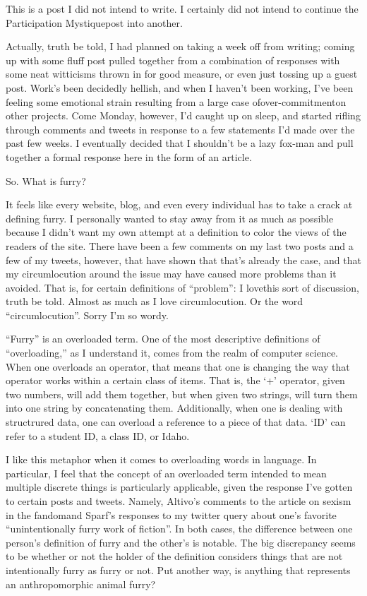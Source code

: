 
This is a post I did not intend to write. I certainly did not intend to continue the Participation Mystiquepost into another.

Actually, truth be told, I had planned on taking a week off from writing; coming up with some fluff post pulled together from a combination of responses with some neat witticisms thrown in for good measure, or even just tossing up a guest post. Work's been decidedly hellish, and when I haven't been working, I've been feeling some emotional strain resulting from a large case ofover-commitmenton other projects. Come Monday, however, I'd caught up on sleep, and started rifling through comments and tweets in response to a few statements I'd made over the past few weeks. I eventually decided that I shouldn't be a lazy fox-man and pull together a formal response here in the form of an article.

So. What is furry?

It feels like every website, blog, and even every individual has to take a crack at defining furry. I personally wanted to stay away from it as much as possible because I didn't want my own attempt at a definition to color the views of the readers of the site. There have been a few comments on my last two posts and a few of my tweets, however, that have shown that that's already the case, and that my circumlocution around the issue may have caused more problems than it avoided. That is, for certain definitions of ``problem'': I lovethis sort of discussion, truth be told. Almost as much as I love circumlocution. Or the word ``circumlocution''. Sorry I'm so wordy.

``Furry'' is an overloaded term. One of the most descriptive definitions of ``overloading,'' as I understand it, comes from the realm of computer science. When one overloads an operator, that means that one is changing the way that operator works within a certain class of items. That is, the `+' operator, given two numbers, will add them together, but when given two strings, will turn them into one string by concatenating them. Additionally, when one is dealing with structrured data, one can overload a reference to a piece of that data. `ID' can refer to a student ID, a class ID, or Idaho.

I like this metaphor when it comes to overloading words in language. In particular, I feel that the concept of an overloaded term intended to mean multiple discrete things is particularly applicable, given the response I've gotten to certain posts and tweets. Namely, Altivo's comments to the article on sexism in the fandomand Sparf's responses to my twitter query about one's favorite ``unintentionally furry work of fiction''. In both cases, the difference between one person's definition of furry and the other's is notable. The big discrepancy seems to be whether or not the holder of the definition considers things that are not intentionally furry as furry or not. Put another way, is anything that represents an anthropomorphic animal furry?

